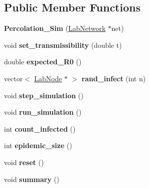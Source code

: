 \subsection*{Public Member Functions}
\begin{DoxyCompactItemize}
\item 
\hypertarget{classstudy_1_1_percolation___sim_aea79924947fc2347560b81115a78e6d1}{{\bfseries Percolation\+\_\+\+Sim} (\hyperlink{classelps_1_1_lab_network}{Lab\+Network} $\ast$net)}\label{classstudy_1_1_percolation___sim_aea79924947fc2347560b81115a78e6d1}

\item 
\hypertarget{classstudy_1_1_percolation___sim_a8b7d92c7236dd8354fe0f10f174d4fde}{void {\bfseries set\+\_\+transmissibility} (double t)}\label{classstudy_1_1_percolation___sim_a8b7d92c7236dd8354fe0f10f174d4fde}

\item 
\hypertarget{classstudy_1_1_percolation___sim_acf6db39bca6f1364f5b82267d4be0868}{double {\bfseries expected\+\_\+\+R0} ()}\label{classstudy_1_1_percolation___sim_acf6db39bca6f1364f5b82267d4be0868}

\item 
\hypertarget{classstudy_1_1_percolation___sim_a24234b5798fc6928f37a73e08e252e5a}{vector$<$ \hyperlink{classelps_1_1_lab_node}{Lab\+Node} $\ast$ $>$ {\bfseries rand\+\_\+infect} (int n)}\label{classstudy_1_1_percolation___sim_a24234b5798fc6928f37a73e08e252e5a}

\item 
\hypertarget{classstudy_1_1_percolation___sim_a1021ed4c69f97ee07bb485d11b014c7c}{void {\bfseries step\+\_\+simulation} ()}\label{classstudy_1_1_percolation___sim_a1021ed4c69f97ee07bb485d11b014c7c}

\item 
\hypertarget{classstudy_1_1_percolation___sim_ad2f15ed7cb39ce32f8c03269105d5559}{void {\bfseries run\+\_\+simulation} ()}\label{classstudy_1_1_percolation___sim_ad2f15ed7cb39ce32f8c03269105d5559}

\item 
\hypertarget{classstudy_1_1_percolation___sim_a7afc40edd2639512034c25c7d85bdd55}{int {\bfseries count\+\_\+infected} ()}\label{classstudy_1_1_percolation___sim_a7afc40edd2639512034c25c7d85bdd55}

\item 
\hypertarget{classstudy_1_1_percolation___sim_a4e29685b995198689b1934f1ba94ff41}{int {\bfseries epidemic\+\_\+size} ()}\label{classstudy_1_1_percolation___sim_a4e29685b995198689b1934f1ba94ff41}

\item 
\hypertarget{classstudy_1_1_percolation___sim_a5d04918ae77e4756f8eec5578e81395b}{void {\bfseries reset} ()}\label{classstudy_1_1_percolation___sim_a5d04918ae77e4756f8eec5578e81395b}

\item 
\hypertarget{classstudy_1_1_percolation___sim_a5b0a185838316d8ec57ae02a61e6d76a}{void {\bfseries summary} ()}\label{classstudy_1_1_percolation___sim_a5b0a185838316d8ec57ae02a61e6d76a}

\end{DoxyCompactItemize}
